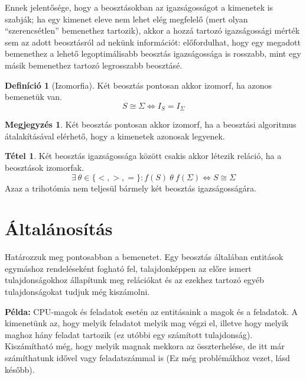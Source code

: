\documentclass[twocolumn]{article}
\theoremstyle{definition}
\newtheorem{definition}{Definíció}[section]
\newtheorem{theorem}{Tétel}[section]
\newtheorem*{megj}{Megjegyzés}
\newcommand{\set}[1]{ \{ {#1} \} }
\newcommand{\pl}{ \textbf{Példa:} }
\begin{document}
    Ennek jelentősége, hogy a beosztásokban az igazságosságot a kimenetek is szabják; ha egy kimenet eleve nem lehet elég megfelelő (mert olyan \enquote{szerencsétlen} bemenethez tartozik), akkor a hozzá tartozó igazságossági mérték sem az adott beosztásról ad nekünk információt: előfordulhat, hogy egy megadott bemenethez a lehető legoptimálisabb beosztás igazságossága is rosszabb, mint egy másik bemenethez tartozó legrosszabb beosztásé.
    
    \begin{definition}[Izomorfia]
        Két beosztás pontosan akkor izomorf, ha azonos bemenetük van.
        \begin{equation} S \cong \Sigma \Longleftrightarrow I_S = I_\Sigma \end{equation}
        \begin{megj}
            Két beosztás pontosan akkor izomorf, ha a beosztási algoritmus átalakításával elérhető, hogy a kimenetek azonosak legyenek.
        \end{megj}
    \end{definition}
    
    \begin{theorem}\label{thm:trihotomia}
        Két beosztás igazságossága között csakis akkor létezik reláció, ha a beosztások izomorfak.
        \begin{equation} \exists \ \theta \in \set{<, >, =}: f(S)\ \theta\ f(\Sigma) \Longleftrightarrow S \cong \Sigma \end{equation}
        Azaz a trihotómia nem teljesül bármely két beosztás igazságosságára.
    \end{theorem}
    
\section{Általánosítás}
    
    Határozzuk meg pontosabban a bemenetet. Egy beosztás általában entitások egymáshoz rendeléseként fogható fel, talajdonképpen az előre ismert tulajdonságokhoz állapítunk meg relációkat és az ezekhez tartozó egyéb tulajdonságokat tudjuk még kiszámolni.
    
    \pl CPU-magok és feladatok esetén az entitásaink a magok és a feladatok. A kimenetünk az, hogy melyik feladatot melyik mag végzi el, illetve hogy melyik maghoz hány feladat tartozik (ez utóbbi egy számított tulajdonság). Kiszámítható még, hogy melyik magnak mekkora az összterhelése, de itt már számíthatunk idővel vagy feladatszámmal is (Ez még problémákhoz vezet, lásd később).
    
\end{document}
